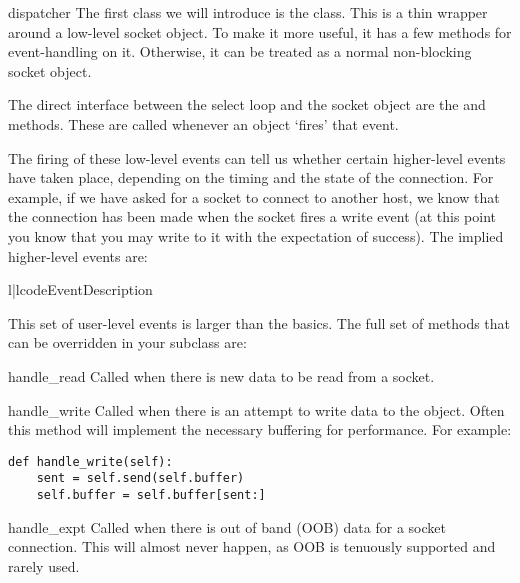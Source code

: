 \begin{classdesc}{dispatcher}{}
  The first class we will introduce is the  class. 
  This is a thin wrapper around a low-level socket object.  To make 
  it more useful, it has a few methods for event-handling on it.  
  Otherwise, it can be treated as a normal non-blocking socket object.

  The direct interface between the select loop and the socket object
  are the  and 
   methods. These are called whenever an 
  object `fires' that event.

  The firing of these low-level events can tell us whether certain 
  higher-level events have taken place, depending on the timing and 
  the state of the connection.  For example, if we have asked for a 
  socket to connect to another host, we know that the connection has 
  been made when the socket fires a write event (at this point you 
  know that you may write to it with the expectation of success).  
  The implied higher-level events are:

  \begin{tableii}{l|l}{code}{Event}{Description}
  \end{tableii}
\end{classdesc}

This set of user-level events is larger than the basics.  The 
full set of methods that can be overridden in your subclass are:

\begin{methoddesc}{handle_read}{}
  Called when there is new data to be read from a socket.
\end{methoddesc}

\begin{methoddesc}{handle_write}{}
  Called when there is an attempt to write data to the object.  
  Often this method will implement the necessary buffering for 
  performance.  For example:

\begin{verbatim}
def handle_write(self):
    sent = self.send(self.buffer)
    self.buffer = self.buffer[sent:]
\end{verbatim}
\end{methoddesc}

\begin{methoddesc}{handle_expt}{}
  Called when there is out of band (OOB) data for a socket 
  connection.  This will almost never happen, as OOB is 
  tenuously supported and rarely used.
\end{methoddesc}

